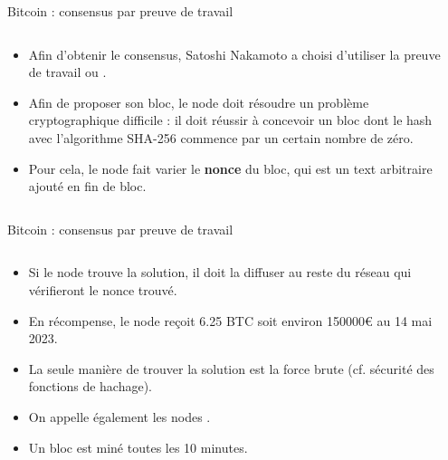 \begin{frame}{Bitcoin : consensus par preuve de travail }

  \begin{columns}
    \begin{column}{0.5\textwidth}
      \begin{itemize}
        \item Afin d'obtenir le consensus, Satoshi Nakamoto a choisi d'utiliser la preuve de travail ou .
        \item Afin de proposer son bloc, le node doit résoudre un problème cryptographique difficile : il doit réussir à concevoir un bloc dont le hash avec l'algorithme SHA-256 commence par un certain nombre de zéro.
        \item Pour cela, le node fait varier le \textbf{nonce} du bloc, qui est un text arbitraire ajouté en fin de bloc.
      \end{itemize}

    \end{column}

    \begin{column}{0.5\textwidth}
      
    \end{column}
  \end{columns}
\end{frame}

\begin{frame}{Bitcoin : consensus par preuve de travail }
  \begin{columns}
    \begin{column}{0.5\textwidth}
      \begin{itemize}
        \item Si le node trouve la solution, il doit la diffuser au reste du réseau qui vérifieront le nonce trouvé.
        \item En récompense, le node reçoit 6.25 BTC soit environ 150000€ au 14 mai 2023.
        \item La seule manière de trouver la solution est la force brute (cf. sécurité des fonctions de hachage).
        \item On appelle également les nodes .
        \item Un bloc est miné toutes les 10 minutes.
      \end{itemize}

    \end{column}

    \begin{column}{0.5\textwidth}
      
    \end{column}
  \end{columns}
\end{frame}

